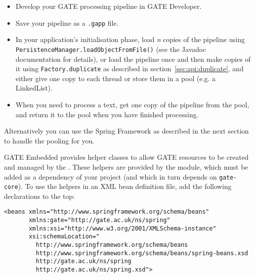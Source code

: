 \begin{itemize}
\item Develop your GATE processing pipeline in GATE Developer.
\item Save your pipeline as a \texttt{.gapp} file.
\item In your application's initialisation phase, load {\em n} copies of the
pipeline using \texttt{PersistenceManager.loadObjectFromFile()} (see the
Javadoc documentation for details), or load the pipeline once and then make
copies of it using \texttt{Factory.duplicate} as described in
section~\ref{sec:api:duplicate}, and either give one copy to each thread or
store them in a pool (e.g. a LinkedList).
\item When you need to process a text, get one copy of the pipeline from the
pool, and return it to the pool when you have finished processing.
\end{itemize}

Alternatively you can use the Spring Framework as described in the next section
to handle the pooling for you.


GATE Embedded provides helper classes to allow GATE resources to be created and
managed by the .
These helpers are provided by the
module, which must be added as a dependency of your project (and which in turn
depends on \verb!gate-core!).  To use the helpers in an XML bean definition
file, add the following declarations to the top:
\begin{small}\begin{verbatim}
<beans xmlns="http://www.springframework.org/schema/beans"
       xmlns:gate="http://gate.ac.uk/ns/spring"
       xmlns:xsi="http://www.w3.org/2001/XMLSchema-instance"
       xsi:schemaLocation="
         http://www.springframework.org/schema/beans
         http://www.springframework.org/schema/beans/spring-beans.xsd
         http://gate.ac.uk/ns/spring
         http://gate.ac.uk/ns/spring.xsd">
\end{verbatim}\end{small}

